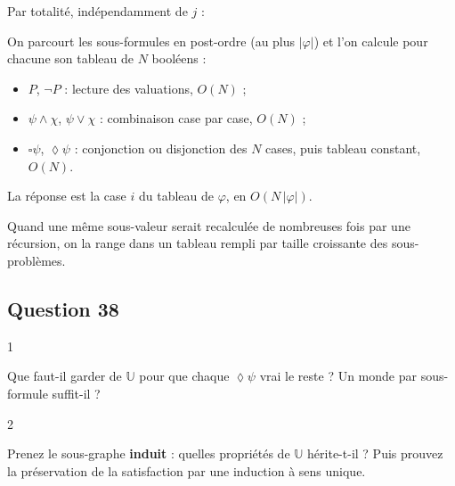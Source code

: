 \documentclass[11pt,a4paper]{article}
\providecommand{\tightlist}{\setlength{\itemsep}{0pt}\setlength{\parskip}{0pt}}
\providecommand{\Box}{\square}
\providecommand{\Diamond}{\lozenge}
\newcommand{\equationajustee}[1]{%
  \sbox{\boiteequation}{$\displaystyle #1$}%
  \ifdim\wd\boiteequation>\linewidth
    \[\resizebox{\linewidth}{!}{\usebox{\boiteequation}}\]%
  \else
    \[#1\]%
  \fi}
\begin{document}
Par totalité, indépendamment de \(j\) :

\equationajustee{
\begin{aligned}
\mathbb U\models_j\Box\psi&\iff\forall k,\ \mathbb U\models_k\psi\\
\mathbb U\models_j\Diamond\psi&\iff\exists k,\ \mathbb U\models_k\psi
\end{aligned}
}

On parcourt les sous-formules en post-ordre (au plus \(|\varphi|\)) et l'on calcule pour chacune son tableau de \(N\) booléens :

\begin{itemize}
\tightlist
\item
  \(P\), \(\neg P\) : lecture des valuations, \(O(N)\) ;
\item
  \(\psi\wedge\chi\), \(\psi\vee\chi\) : combinaison case par case, \(O(N)\) ;
\item
  \(\Box\psi\), \(\Diamond\psi\) : conjonction ou disjonction des \(N\) cases, puis tableau constant, \(O(N)\).
\end{itemize}

La réponse est la case \(i\) du tableau de \(\varphi\), en \(O(N\,|\varphi|)\).

\begin{methode}

Quand une même sous-valeur serait recalculée de nombreuses fois par une récursion, on la range dans un tableau rempli par taille croissante des sous-problèmes.

\end{methode}

\hypertarget{question-38}{%
\subsection{Question 38}\label{question-38}}

\begin{indication}{1}

Que faut-il garder de \(\mathbb U\) pour que chaque \(\Diamond\psi\) vrai le reste ? Un monde par sous-formule suffit-il ?

\end{indication}

\begin{indication}{2}

Prenez le sous-graphe \textbf{induit} : quelles propriétés de \(\mathbb U\) hérite-t-il ? Puis prouvez la préservation de la satisfaction par une induction à sens unique.

\end{indication}
\end{document}
